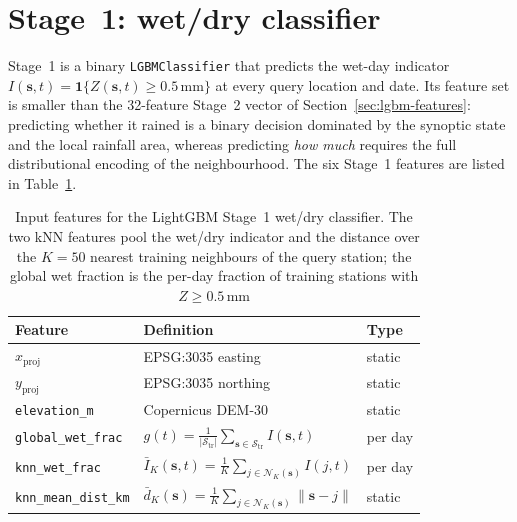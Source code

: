 \section{Stage~1: wet/dry classifier}
\label{sec:lgbm-stage1}

Stage~1 is a binary \texttt{LGBMClassifier} that predicts the wet-day
indicator $I(\mathbf{s}, t) = \mathbf{1}\{Z(\mathbf{s}, t) \ge
0{.}5\,\mathrm{mm}\}$ at every query location and date. Its feature
set is smaller than the 32-feature Stage~2 vector of
Section~\ref{sec:lgbm-features}: predicting whether it rained is a
binary decision dominated by the synoptic state and the local rainfall
area, whereas predicting \emph{how much} requires the full
distributional encoding of the neighbourhood. The six Stage~1 features
are listed in Table~\ref{tab:lgbm-stage1-features}.

\begin{table}[ht]
  \centering
  \caption{Input features for the LightGBM Stage~1 wet/dry classifier.
  The two kNN features pool the wet/dry indicator and the distance over
  the $K = 50$ nearest training neighbours of the query station; the
  global wet fraction is the per-day fraction of training stations with
  $Z \ge 0{.}5\,\mathrm{mm}$}
  \label{tab:lgbm-stage1-features}
  \begin{tabular}{l l l}
    \toprule
    Feature & Definition & Type \\
    \midrule
    $x_{\mathrm{proj}}$        & EPSG:3035 easting   & static  \\
    $y_{\mathrm{proj}}$        & EPSG:3035 northing  & static  \\
    \texttt{elevation\_m}      & Copernicus DEM-30   & static  \\
    \texttt{global\_wet\_frac} &
      $g(t) = \frac{1}{|\mathcal{S}_{\mathrm{tr}}|}
        \sum_{\mathbf{s} \in \mathcal{S}_{\mathrm{tr}}} I(\mathbf{s}, t)$
                                                    & per day \\
    \texttt{knn\_wet\_frac}    &
      $\bar{I}_K(\mathbf{s}, t) =
        \frac{1}{K} \sum_{j \in \mathcal{N}_K(\mathbf{s})} I(j, t)$
                                                    & per day \\
    \texttt{knn\_mean\_dist\_km} &
      $\bar{d}_K(\mathbf{s}) =
        \frac{1}{K} \sum_{j \in \mathcal{N}_K(\mathbf{s})}
          \|\mathbf{s} - j\|$                       & static  \\
    \bottomrule
  \end{tabular}
\end{table}

